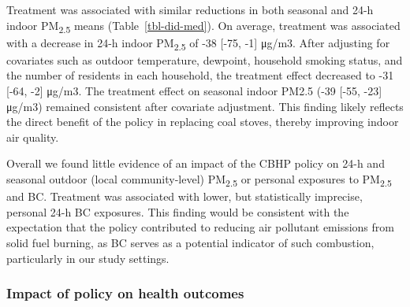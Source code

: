 \documentclass[
  letterpaper,
  DIV=11,
  numbers=noendperiod]{scrartcl}
\begin{document}
Treatment was associated with similar reductions in both seasonal and
24-h indoor PM\textsubscript{2.5} means (Table~\ref{tbl-did-med}). On
average, treatment was associated with a decrease in 24-h indoor
PM\textsubscript{2.5} of -38 {[}-75, -1{]} μg/m3. After adjusting for
covariates such as outdoor temperature, dewpoint, household smoking
status, and the number of residents in each household, the treatment
effect decreased to -31 {[}-64, -2{]} μg/m3. The treatment effect on
seasonal indoor PM2.5 (-39 {[}-55, -23{]} μg/m3) remained consistent
after covariate adjustment. This finding likely reflects the direct
benefit of the policy in replacing coal stoves, thereby improving indoor
air quality.

Overall we found little evidence of an impact of the CBHP policy on 24-h
and seasonal outdoor (local community-level) PM\textsubscript{2.5} or
personal exposures to PM\textsubscript{2.5} and BC. Treatment was
associated with lower, but statistically imprecise, personal 24-h BC
exposures. This finding would be consistent with the expectation that
the policy contributed to reducing air pollutant emissions from solid
fuel burning, as BC serves as a potential indicator of such combustion,
particularly in our study settings.

\hypertarget{impact-of-policy-on-health-outcomes}{%
\subsubsection{Impact of policy on health
outcomes}\label{impact-of-policy-on-health-outcomes}}
\end{document}
